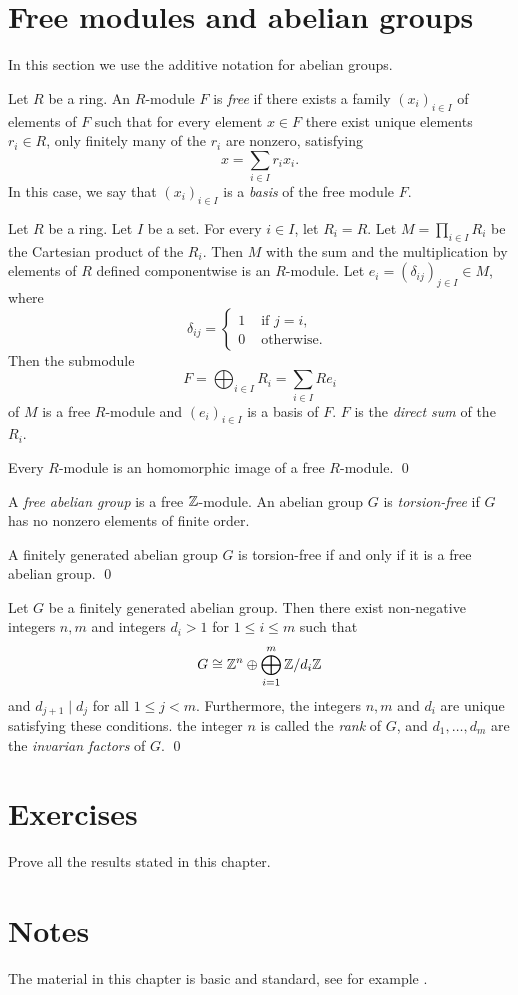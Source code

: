 \section{Free modules and abelian groups}
In this section we use the additive notation for abelian groups.

Let $R$ be a ring. An $R$-module $F$ is {\em free} if there exists a family $(x_i)_{i\in I}$ of elements of $F$ such that for every element $x\in F$ there exist unique elements $r_i\in R$, only finitely many of the $r_i$ are nonzero, satisfying 
\[x=\sum_{i\in I}r_ix_i.\]
In this case, we say that $(x_i)_{i\in I}$ is a {\em basis} of the free module $F$.

\begin{example}
Let $R$ be a ring. Let $I$ be a set. For every $i\in I$, let $R_i=R$.
Let $M=\prod_{i\in I}R_i$ be the Cartesian product of the $R_i$. Then $M$ with the sum and the multiplication by elements of $R$ defined componentwise is an $R$-module. Let $e_i=(\delta_{ij})_{j\in I}\in M$, where 
\[\delta_{ij}=\left\{\begin{array}{cl}
1&\text{ if }j=i,\\
0&\text{ otherwise. }
\end{array}\right. \]
Then the submodule
\[ F=\bigoplus_{i\in I}R_i=\sum_{i\in I}Re_i\]
of $M$ is a free $R$-module and $(e_{i})_{i\in I}$ is a basis of $F$. $F$ is the {\em direct sum} of the $R_i$.
\end{example}

\begin{proposition}
Every $R$-module is an homomorphic image of a free $R$-module. \qed 
\end{proposition}

A {\em free abelian group} is a free $\mathbb{Z}$-module. An abelian group $G$ is {\em torsion-free} if $G$ has no nonzero elements of finite order.

\begin{proposition}
A finitely generated abelian group $G$ is torsion-free if and only if it is a free abelian group. \qed 
\end{proposition}

\begin{theorem}
Let $G$ be a finitely generated abelian group. Then there exist non-negative integers $n,m$ and integers $d_i>1$ for $1\leq i\leq m$ such that
\[ G\cong \mathbb{Z}^n\oplus \bigoplus_{i=1}^m\mathbb{Z}/d_i\mathbb{Z}\]
and $d_{j+1} \mid d_j$ for all $1\leq j<m$. Furthermore, the integers $n,m$ and $d_i$ are unique satisfying these conditions. the integer $n$ is called the {\em rank} of $G$, and $d_1,\dots ,d_m$ are the {\em invarian factors} of $G$. \qed  
\end{theorem}

\section{Exercises}

\begin{prob} 
    Prove all the results stated in this chapter.
\end{prob}

\section{Notes}

The material in this chapter is basic and standard, see for example \cite{Cohn}.
